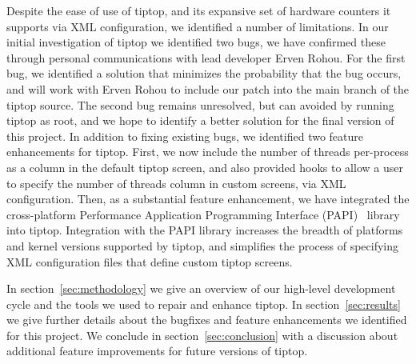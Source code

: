 Despite the ease of use of tiptop, and its expansive set of hardware counters it supports via XML configuration, we identified a number of limitations.
In our initial investigation of tiptop we identified two bugs, we have confirmed these through personal communications with lead developer Erven Rohou.
For the first bug, we identified a solution that minimizes the probability that the bug occurs, and will work with Erven Rohou to include our patch into the main branch of the tiptop source.
The second bug remains unresolved, but can avoided by running tiptop as root, and we hope to identify a better solution for the final version of this project.
In addition to fixing existing bugs, we identified two feature enhancements for tiptop.
First, we now include the number of threads per-process as a column in the default tiptop screen, and also provided hooks to allow a user to specify the number of threads column in custom screens, via XML configuration.
Then, as a substantial feature enhancement, we have integrated the cross-platform Performance Application Programming Interface (PAPI)~\cite{xxx} library into tiptop.
Integration with the PAPI library increases the breadth of platforms and kernel versions supported by tiptop, and simplifies the process of specifying XML configuration files that define custom tiptop screens.

In section~\ref{sec:methodology} we give an overview of our high-level development cycle and the tools we used to repair and enhance tiptop.
In section~\ref{sec:results} we give further details about the bugfixes and feature enhancements we identified for this project.
We conclude in section~\ref{sec:conclusion} with a discussion about additional feature improvements for future versions of tiptop.

